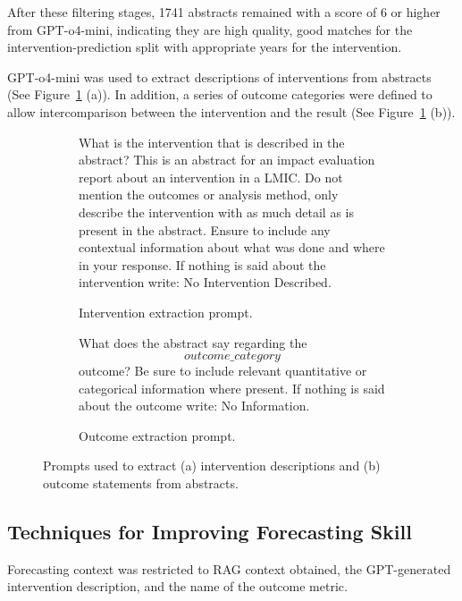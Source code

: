 \documentclass[12pt,a4paper]{article}
\begin{document}
After these filtering stages, 1741 abstracts remained with a score of 6 or higher from GPT-o4-mini, indicating they are high quality, good matches for the intervention-prediction split with appropriate years for the intervention.

GPT-o4-mini was used to extract descriptions of interventions from abstracts (See Figure~\ref{fig:prompts-ib} (a)). In addition, a series of outcome categories were defined to allow intercomparison between the intervention and the result (See Figure~\ref{fig:prompts-ib} (b)). 

\begin{figure}[htbp]
  \centering
  \begin{subfigure}{0.48\textwidth}
    \begin{tcolorbox}[left=4pt, right=4pt, top=4pt, bottom=4pt]
\ttfamily\footnotesize
What is the intervention that is described in the abstract? 
This is an abstract for an impact evaluation report about an intervention in a LMIC. 
Do not mention the outcomes or analysis method, only describe the intervention with as much detail as is present in the abstract. 
Ensure to include any contextual information about what was done and where in your response. 
If nothing is said about the intervention write: No Intervention Described.
    \end{tcolorbox}
    \caption{Intervention extraction prompt.}
  \end{subfigure}\hfill
  \begin{subfigure}{0.48\textwidth}
    \begin{tcolorbox}[left=4pt, right=4pt, top=4pt, bottom=4pt]
\ttfamily\footnotesize
What does the abstract say regarding the \[outcome\_category\] outcome? 
Be sure to include relevant quantitative or categorical information where present. 
If nothing is said about the outcome write: No Information.
    \end{tcolorbox}
    \caption{Outcome extraction prompt.}
  \end{subfigure}
  \caption{Prompts used to extract (a) intervention descriptions and (b) outcome statements from abstracts.}
  \label{fig:prompts-ib}
\end{figure}

\subsection{Techniques for Improving Forecasting Skill}
Forecasting context was restricted to RAG context obtained, the GPT-generated intervention description, and the name of the outcome metric.
\end{document}
